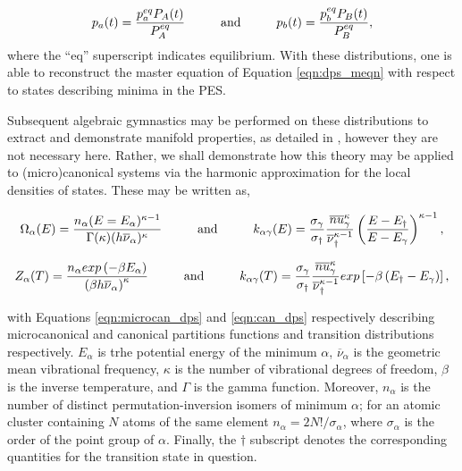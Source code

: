\begin{equation}
    p_{a}(t) = \frac{p_{a}^{eq}P_{A}(t)}{P_{A}^{eq}} \hspace{1.0cm} \text{and} \hspace{1.0cm} p_{b}(t) = \frac{p_{b}^{eq}P_{B}(t)}{P_{B}^{eq}} ,
    \label{eqn:occ_prob_dps_equ}
\end{equation}
 where the ``eq'' superscript indicates equilibrium. With these distributions, one is able to reconstruct the master equation of Equation \ref{eqn:dps_meqn} with respect to states describing minima in the PES. 

 Subsequent algebraic gymnastics may be performed on these distributions to extract and demonstrate manifold properties, as detailed in \cite{doi:10.1080/00268970210162691}, however they are not necessary here. Rather, we shall demonstrate how this theory may be applied to (micro)canonical systems via the harmonic approximation for the local densities of states. These may be written as,

 \begin{equation}
     \Omega_{\alpha}(E) = \frac{ n_{\alpha}(E = E_{\alpha})^{\kappa - 1} } { \Gamma(\kappa) (h\overline{\nu}_{\alpha})^{\kappa} } \hspace{1.0cm} \text{and} \hspace{1.0cm} k_{\alpha\gamma}(E) = \frac{\sigma_{\gamma}}{\sigma_{\dagger}} \frac{  \overline{nu}_{\gamma}^{\kappa} } { \overline{\nu}_{\dagger}^{\kappa -1} } \left( \frac{ E-E_{\dagger} }{ E-E_{\gamma} } \right)^{\kappa - 1},
     \label{eqn:microcan_dps}
 \end{equation}

 \begin{equation}
     Z_{\alpha}(T) = \frac{ n_{\alpha} exp\left( -\beta E_{\alpha} \right) } { \left(\beta h \overline{\nu}_{\alpha} \right)^{\kappa} } \hspace{1.0cm} \text{and} \hspace{1.0cm} k_{\alpha\gamma}(T) =  \frac{\sigma_{\gamma}}{\sigma_{\dagger}} \frac{  \overline{nu}_{\gamma}^{\kappa} } { \overline{\nu}_{\dagger}^{\kappa -1} } exp\left[ -\beta \left( E_{\dagger} - E_{\gamma} \right) \right],
     \label{eqn:can_dps}
 \end{equation}

with Equations \ref{eqn:microcan_dps} and \ref{eqn:can_dps} respectively describing microcanonical and canonical partitions functions and transition distributions respectively. $E_{\alpha}$ is trhe potential energy of the minimum $\alpha$, $\overline{\nu}_{\alpha}$ is the geometric mean vibrational frequency, $\kappa$ is the number of vibrational degrees of freedom, $\beta$ is the inverse temperature, and $\Gamma$ is the gamma function. Moreover, $n_{\alpha}$ is the number of distinct permutation-inversion isomers of minimum $\alpha$; for an atomic cluster containing $N$ atoms of the same element $n_{\alpha} = 2N!/\sigma_{\alpha}$, where $\sigma_{\alpha}$ is the order of the point group of $\alpha$. Finally, the $\dagger$ subscript denotes the corresponding quantities for the transition state in question.

